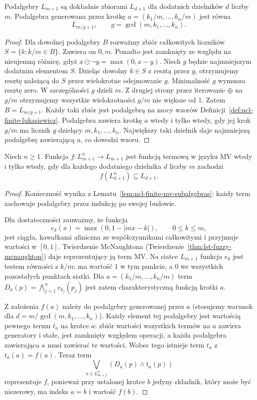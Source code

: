 \begin{lemat}
\label{lem:ncl-finite-mv-subalgebras}
Podalgebry $L_{m+1}$ są dokładnie zbiorami $L_{d+1}$
dla dodatnich dzielników $d$ liczby $m$.
Podalgebra generowana przez krotkę
$a=(k_1/m,\ldots,k_n/m)$ jest równa
\[
 L_{m/g+1},\qquad g=\gcd(m,k_1,\ldots,k_n).
\]
\end{lemat}
\begin{proof}
Dla dowolnej podalgebry $B$ rozważmy zbiór
całkowitych liczników $S=\{k:k/m\in B\}$.
Zawiera on $0,m$. Ponadto jest zamknięty ze względu
na nieujemną różnicę, gdyż
$x\odot\neg y=\max(0,x-y)$.
Niech $g$ będzie najmniejszym dodatnim elementem $S$.
Dzieląc dowolny $k\in S$ z resztą przez $g$,
otrzymujemy resztę należącą do $S$ przez wielokrotne
odejmowanie $g$. Minimalność $g$ wymusza resztę zero.
W szczególności $g$ dzieli $m$.
Z drugiej strony przez iterowanie $\oplus$ na $g/m$
otrzymujemy wszystkie wielokrotności $g/m$ nie większe
od $1$. Zatem $B=L_{m/g+1}$.
Każdy taki zbiór jest podalgebrą na mocy wzorów
Definicji~\ref{def:ncl-finite-lukasiewicz}.
Podalgebra zawiera krotkę $a$ wtedy i tylko wtedy,
gdy jej krok $g/m$ ma licznik $g$ dzielący
$m,k_1,\ldots,k_n$. Największy taki dzielnik
daje najmniejszą podalgebrę zawierającą $a$,
co dowodzi wzoru.
\end{proof}

\begin{twierdzenie}
\label{thm:ncl-finite-mv-term-functions}
Niech $n\geq1$. Funkcja $f:L_{m+1}^n\to L_{m+1}$
jest funkcją termową w języku MV wtedy i tylko wtedy,
gdy dla każdego dodatniego dzielnika $d$ liczby $m$
zachodzi
\[
 f(L_{d+1}^n)\subseteq L_{d+1}.
\]
\end{twierdzenie}
\begin{proof}
Konieczność wynika z Lematu~\ref{lem:ncl-finite-mv-subalgebras}:
każdy term zachowuje podalgebry przez indukcję
po swojej budowie.

Dla dostateczności zauważmy, że funkcja
\[
 e_k(x)=\max(0,1-|mx-k|),\qquad 0\leq k\leq m,
\]
jest ciągła, kawałkami afiniczna ze współczynnikami
całkowitymi i przyjmuje wartości w $[0,1]$.
Twierdzenie McNaughtona
(Twierdzenie~\ref{thm:lst-fuzzy-mcnaughton})
daje reprezentujący ją term MV. Na siatce $L_{m+1}$
funkcja $e_k$ jest testem równości z $k/m$:
ma wartość $1$ w tym punkcie, a $0$ we wszystkich
pozostałych punktach siatki.
Dla $a=(k_1/m,\ldots,k_n/m)$ term
$D_a(p)=\bigwedge_{j=1}^n e_{k_j}(p_j)$
jest zatem charakterystyczną funkcją krotki $a$.

Z założenia $f(a)$ należy do podalgebry
generowanej przez $a$ (stosujemy warunek dla
$d=m/\gcd(m,k_1,\ldots,k_n)$).
Każdy element tej podalgebry jest wartością
pewnego termu $t_a$ na krotce $a$: zbiór wartości
wszystkich termów na $a$ zawiera generatory i stałe,
jest zamknięty względem operacji, a każda podalgebra
zawierająca $a$ musi zawierać te wartości.
Wobec tego istnieje term $t_a$ z $t_a(a)=f(a)$.
Teraz term
\[
 \bigvee_{a\in L_{m+1}^n}(D_a(p)\wedge t_a(p))
\]
reprezentuje $f$, ponieważ przy ustalonej krotce
$b$ jedyny składnik, który może być niezerowy,
ma indeks $a=b$ i wartość $f(b)$.
\end{proof}

